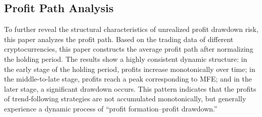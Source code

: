 \documentclass[12pt]{article}
\begin{document}
\begin{table}[htbp]
\centering
\caption{Statistical Results of Trading Paths}
\label{tab:trading_path_statistics}
\small
\setlength{\tabcolsep}{4pt}
\renewcommand{\arraystretch}{1.15}
\end{table}

\subsection{Profit Path Analysis}

To further reveal the structural characteristics of unrealized profit drawdown risk, this paper 
analyzes the profit path. Based on the trading data of different cryptocurrencies, this paper 
constructs the average profit path after normalizing the holding period. The results show a 
highly consistent dynamic structure: in the early stage of the holding period, profits increase 
monotonically over time; in the middle-to-late stage, profits reach a peak corresponding to MFE; 
and in the later stage, a significant drawdown occurs. This pattern indicates that the profits 
of trend-following strategies are not accumulated monotonically, but generally experience a 
dynamic process of ``profit formation--profit drawdown.''
\end{document}
